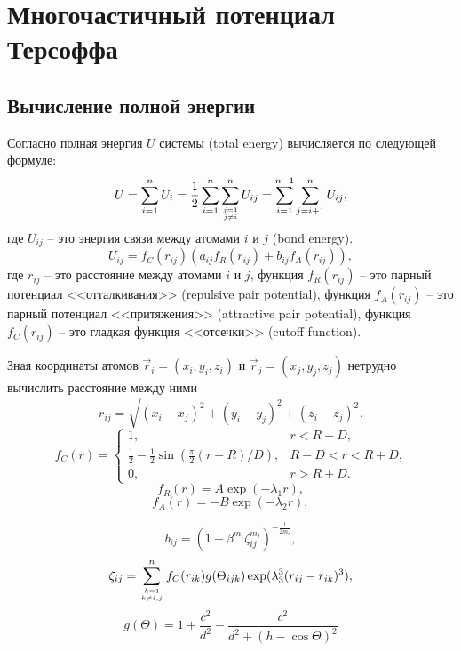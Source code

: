 \section{Многочастичный потенциал Терсоффа}

\subsection{Вычисление полной энергии}

Согласно \cite{tersoff88} полная энергия $U$ системы (total energy) вычисляется по следующей формуле:
\begin{equation}\label{eq:tersoff88}
U = \displaystyle\sum_{i=1}^{n} U_i = \frac{1}{2}\sum_{i = 1}^{n}\sum_{j = 1 \atop j \neq i}^{n} U_{ij} = \sum_{i = 1}^{n - 1}\sum_{j = i + 1}^{n} U_{ij},
\end{equation}
где $U_{ij}$ -- это энергия связи между атомами $i$ и $j$ (bond energy).
\begin{equation}\label{eq:bondenergy}
U_{ij} = f_C(r_{ij})(a_{ij}f_R(r_{ij}) + b_{ij}f_A(r_{ij})),
\end{equation}
где $r_{ij}$ -- это расстояние между атомами $i$ и $j$, функция $f_R(r_{ij})$ -- это парный потенциал <<отталкивания>> (repulsive pair potential), функция $f_A(r_{ij})$ -- это парный потенциал <<притяжения>> (attractive pair potential), функция $f_C(r_{ij})$ -- это гладкая функция <<отсечки>> (cutoff function).

Зная координаты атомов $\vec{r}_i = (x_i, y_i, z_i)$ и $\vec{r}_j = (x_j, y_j, z_j)$ нетрудно вычислить расстояние между ними
\begin{equation}\label{eq:rij}
r_{ij} = \sqrt{(x_i - x_j)^2 + (y_i - y_j)^2 + (z_i - z_j)^2}.
\end{equation}
\[
f_C(r) =
\begin{cases}
1, &\text{$r < R - D$,}\\
\frac{1}{2} - \frac{1}{2}\sin(\frac{\pi}{2} (r -R) / D), &\text{$R - D < r < R + D$,}\\
0, &\text{$r > R + D$.}
\end{cases}
\]
\begin{equation}
f_R(r) = A \exp (- \lambda_1 r), 
\end{equation}
\begin{equation}
f_A(r) = -B \exp (- \lambda_2 r),
\end{equation}

\begin{equation}
b_{ij} = (1 + \beta^{m_i} \zeta_{ij}^{m_i}) ^ {-\frac{1}{2m_i}}, 
\end{equation}
\begin{equation}
\zeta_{ij} = \displaystyle\sum_{k=1 \atop k \neq i, j}^{n}f_C(r_{ik})g(\Theta_{ijk})\exp(\lambda_{3}^{3}(r_{ij} - r_{ik})^3), 
\end{equation}
\begin{equation}
g(\Theta) = 1 + \frac{c^2}{d^2} - \frac{c^2}{d^2 + (h - \cos\Theta) ^ 2}
\end{equation}

